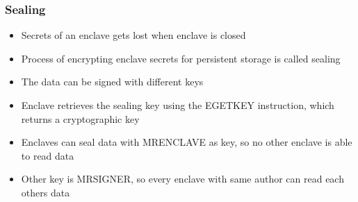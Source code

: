 \begin{frame}
    \frametitle{Sealing}
    \begin{itemize}[<+->]
        \item Secrets of an enclave gets lost when enclave is closed
        \item Process of encrypting enclave secrets for persistent storage is called sealing
        \item The data can be signed with different keys
        \item Enclave retrieves the sealing key using the EGETKEY instruction, which returns a cryptographic key
        \item Enclaves can seal data with MRENCLAVE as key, so no other enclave is able to read data
        \item Other key is MRSIGNER, so every enclave with same author can read each others data
    \end{itemize}
\end{frame}